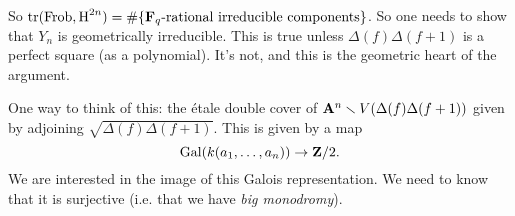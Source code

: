 So $\operatorname{tr}(\operatorname{Frob},\operatorname{H}^{2n}) = \#\{\mathbf{F}_q\text{-rational irreducible components}\}$. 
So one needs to show that $Y_n$ is geometrically irreducible. This is true 
unless $\Delta(f)\Delta(f+1)$ is a perfect square (as a polynomial). It's not, 
and this is the geometric heart of the argument. 

One way to think of this: the \'etale double cover of 
$\mathbf{A}^n\smallsetminus V(\Delta(f)\Delta(f+1))$ given by adjoining 
$\sqrt{\Delta(f)\Delta(f+1)}$. This is given by a map 
\[
  \operatorname{Gal}(k(a_1,\dots,a_n)) \to \mathbf{Z}/2 .
\]
We are interested in the image of this Galois representation. We need to know 
that it is surjective (i.e. that we have \emph{big monodromy}). 




